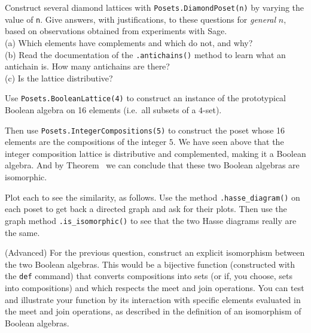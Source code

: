 Construct several diamond lattices with \verb?Posets.DiamondPoset(n)? by varying the value of \verb?n?.  Give answers, with justifications, to these questions for \emph{general} $n$, based on observations obtained from experiments with Sage.\\
%
(a) Which elements have complements and which do not, and why?\\
%
(b) Read the documentation of the \verb?.antichains()? method to learn what an antichain is.  How many antichains are there?\\
%
(c) Is the lattice distributive?
\begin{sageverbatim}\end{sageverbatim}
%
%
Use \verb?Posets.BooleanLattice(4)? to construct an instance of the prototypical Boolean algebra on 16 elements (i.e.\ all subsets of a $4$-set).\par
%
Then use \verb?Posets.IntegerCompositions(5)? to construct the poset whose 16 elements are the compositions of the integer $5$.  We have seen above that the integer composition lattice is distributive and complemented, making it a Boolean algebra.  And by Theorem~ we can conclude that these two Boolean algebras are isomorphic.\par
%
Plot each to see the similarity, as follows.  Use the method \verb?.hasse_diagram()? on each poset to get back a directed graph and ask for their plots.  Then use the graph method \verb?.is_isomorphic()? to see that the two Hasse diagrams really are the same.
\begin{sageverbatim}\end{sageverbatim}
%
%
(Advanced) For the previous question, construct an explicit isomorphism between the two Boolean algebras.  This would be a bijective function (constructed with the \verb?def? command) that converts compositions into sets (or if, you choose, sets into compositions) and which respects the meet and join operations.  You can test and illustrate your function by its interaction with specific elements evaluated in the meet and join operations, as described in the definition of an isomorphism of Boolean algebras.
